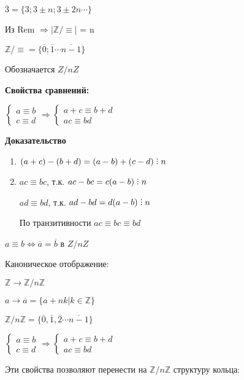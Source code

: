 \documentclass[14pt, letter paper]{article}
\DeclareRobustCommand{\divby}{%
  \mathrel{\text{\vbox{\baselineskip.65ex\lineskiplimit0pt\hbox{.}\hbox{.}\hbox{.}}}}%
}
\begin{document}
$\overline{3} = \{ 3; 3 \pm n; 3 \pm 2n \cdots \}$

Из Rem $\Rightarrow |\mathds{Z}/\equiv$| = n

$\mathds{Z}/\equiv = \{ \overline{0}; \overline{1} \cdots \overline{n - 1} \}$

Обозначается $Z/nZ$

\textbf{Свойства сравнений:}

$\begin{cases}
    a \equiv b \\
    c \equiv d
\end{cases} \Rightarrow \begin{cases}
    a + c \equiv b + d \\
    ac \equiv bd
\end{cases}$

\begin{center}
    \textbf{Доказательство}
\end{center}

\begin{enumerate}
    \item $(a + c) - (b + d) = (a - b) + (c - d) \divby n$
    \item $ac \equiv bc$, т.к. $ac - bc = c(a - b) \divby n$

    $ad \equiv bd$, т.к. $ad - bd = d(a-b) \divby n$

    По транзитивности $ac \equiv bc \equiv bd$
\end{enumerate}

$a \equiv b \Leftrightarrow \overline{a} = \overline{b}$ в $Z/nZ$

Каноническое отображение:

$\mathds{Z} \rightarrow \mathds{Z}/n\mathds{Z}$

$a \rightarrow \overline{a} = \{ a + nk | k \in \mathds{Z}\}$

$\mathds{Z}/n\mathds{Z} = \{ \overline{0}, \overline{1}, \overline{2} \cdots \overline{n-1} \}$

$\begin{cases}
    a \equiv b \\
    c \equiv d
\end{cases} \Rightarrow \begin{cases}
    a + c \equiv b + d \\
    ac \equiv bd
\end{cases}$

Эти свойства позволяют перенести на $\mathds{Z}/n\mathds{Z}$ структуру кольца:
\end{document}
